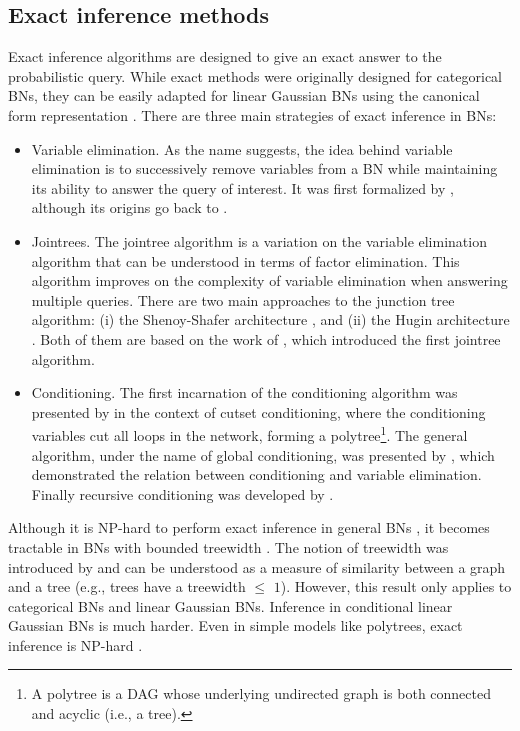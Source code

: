 \subsection{Exact inference methods}
Exact inference algorithms are designed to give an exact answer to the probabilistic query. While exact methods were originally designed for categorical BNs, they can be easily adapted for linear Gaussian BNs using the canonical form representation \citep{lauritzen1992}. There are three main strategies of exact inference in BNs:
\begin{itemize}
	\item Variable elimination. As the name suggests, the idea behind variable elimination is to successively remove variables from a BN while maintaining its ability to answer the query of interest. It was first formalized by \cite{zhang_poole1994}, although its origins go back to \cite{shachter1990}.
	\item Jointrees. The jointree algorithm is a variation on the variable elimination algorithm that can be understood in terms of factor elimination. This algorithm improves on the complexity of variable elimination when answering multiple queries. There are two main approaches to the junction tree algorithm: (i) the Shenoy-Shafer architecture \citep{shenoy1990}, and (ii) the Hugin architecture \citep{jensen1990}. Both of them are based on the work of \cite{lauritzen1988}, which introduced the first jointree algorithm.
	\item Conditioning. The first incarnation of the conditioning algorithm was presented by \cite{pearl1986} in the
	context of cutset conditioning, where the conditioning variables cut all loops in the network, forming a polytree\footnote{A polytree is a DAG whose underlying undirected graph is both connected and acyclic (i.e., a tree).}.  The general algorithm, under the name of global conditioning, was presented by \cite{shachter1994}, which demonstrated the relation between conditioning and variable elimination. Finally recursive conditioning was developed by \cite{darwiche2001}.
\end{itemize}

Although it is NP-hard to perform exact inference in general BNs \citep{cooper1990}, it becomes tractable in BNs with bounded treewidth \citep{kwisthout2010}. The notion of treewidth was introduced by \cite{robertson1986} and can be understood as a measure of similarity between a graph and a tree (e.g., trees have a treewidth $\leq$ $1$). However, this result only applies to categorical BNs and linear Gaussian BNs. Inference in conditional linear Gaussian BNs is much harder. Even in simple models like polytrees, exact inference is NP-hard \citep{lerner2001}.

